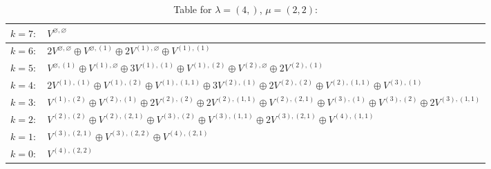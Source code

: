 \documentclass[a4paper,12pt]{article}
\begin{document}
\renewcommand{\arraystretch}{1.6} 
\begin{table}[H]
\centering
\caption{Table for $\lambda = (4,)$, $\mu = (2, 2)$:}
\begin{tabular}{|>{\centering\arraybackslash}p{15cm}|}
\hline
 $k = 7: \quad V^{\varnothing, \varnothing} $ \\ \hline
 $k = 6: \quad 2 V^{\varnothing, \varnothing} \oplus V^{\varnothing, (1)} \oplus 2 V^{(1), \varnothing} \oplus V^{(1), (1)} $ \\ \hline
 $k = 5: \quad V^{\varnothing, (1)} \oplus V^{(1), \varnothing} \oplus 3 V^{(1), (1)} \oplus V^{(1), (2)} \oplus V^{(2), \varnothing} \oplus 2 V^{(2), (1)} $ \\ \hline
 $k = 4: \quad 2 V^{(1), (1)} \oplus V^{(1), (2)} \oplus V^{(1), (1, 1)} \oplus 3 V^{(2), (1)} \oplus 2 V^{(2), (2)} \oplus V^{(2), (1, 1)} \oplus V^{(3), (1)} $ \\ \hline
 $k = 3: \quad V^{(1), (2)} \oplus V^{(2), (1)} \oplus 2 V^{(2), (2)} \oplus 2 V^{(2), (1, 1)} \oplus V^{(2), (2, 1)} \oplus V^{(3), (1)} \oplus V^{(3), (2)} \oplus 2 V^{(3), (1, 1)} $ \\ \hline
 $k = 2: \quad V^{(2), (2)} \oplus V^{(2), (2, 1)} \oplus V^{(3), (2)} \oplus V^{(3), (1, 1)} \oplus 2 V^{(3), (2, 1)} \oplus V^{(4), (1, 1)} $ \\ \hline
 $k = 1: \quad V^{(3), (2, 1)} \oplus V^{(3), (2, 2)} \oplus V^{(4), (2, 1)} $ \\ \hline
 $k = 0: \quad V^{(4), (2, 2)} $ \\ \hline
\end{tabular}
\end{table}
\end{document}
